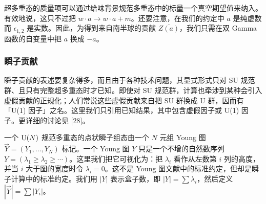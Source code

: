 
超多重态的质量项可以通过给味背景规范多重态中的标量一个真空期望值来纳入。有效地说，这只不过把 $w\cdot a\to w\cdot a+m$。还要注意，在我们的约定中 $a$ 是纯虚数而 $\epsilon_{1,2}$ 是实数。因此，为得到来自南半球的贡献 $\overline{Z(a)}$，我们只需在双 Gamma 函数的自变量中把 $a$ 换成 $-a$。

\subsubsection{瞬子贡献}

瞬子贡献的表述要复杂得多，而且由于各种技术问题，其显式形式只对 SU 规范群、且只有完整超多重态时才已知。即使对 SU 规范群，计算也牵涉到某种会引入虚假贡献的正规化；人们常说这些虚假贡献来自把 SU 群换成 U 群，因而有「U(1) 因子」之名。这里我们只引用已知结果，其中包含虚假因子或 U(1) 因子。更详细的讨论见 [28]。


一个 $\mathrm{U}(N)$ 规范多重态的点状瞬子组态由一个 $N$ 元组 Young 图 $\vec Y=(Y_1,\ldots,Y_N)$ 标记。一个 Young 图 $Y$ 只是一个不增的自然数序列 $Y=(\lambda_1\ge\lambda_2\ge\cdots)$。这里我们把它可视化为：把 $\lambda_i$ 看作从左数第 $i$ 列的高度，并当 $i$ 大于图的宽度时令 $\lambda_i=0$。这不是 Young 图文献中的标准约定，但却是瞬子计算中的标准约定。我们用 $|Y|$ 表示盒子数，即 $|Y|=\sum\lambda_i$，然后定义 $|\vec Y|=\sum|Y_i|$。


